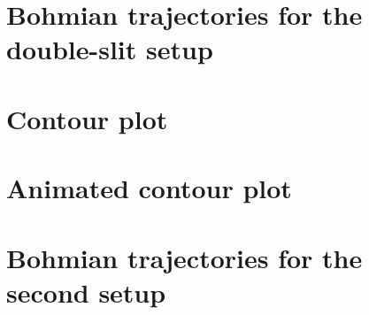 \documentclass[10pt, reqno]{article}
\begin{document}
\section{Bohmian trajectories for the double-slit setup}
\label{appendix:bohmian-trajectories}

\pagebreak 

\section{Contour plot}
\label{appendix:contour-plot}

\pagebreak 

\section{Animated contour plot}
\label{appendix:contour-plot-animated}

\pagebreak 

\section{Bohmian trajectories for the second setup}
\label{appendix:secondary-trajectories}

\pagebreak 
\end{document}
